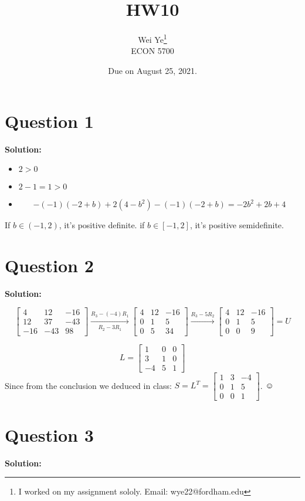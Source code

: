 \documentclass[11pt]{article} %
\title{HW10}
\author{Wei Ye\footnote{I worked on my assignment sololy. Email: wye22@fordham.edu}  	\\
	ECON 5700}
\date{Due on August 25, 2021.}
\begin{document}
	\maketitle
	\section{Question 1}
	\textbf{Solution:}
	
	\begin{itemize}
		\item $2>0$
		\item $2-1=1>0$
		\item 
		$$-(-1)(-2+b)+2(4-b^2)-(-1)(-2+b)=-2b^2+2b+4$$		
		\end{itemize}
			If $b\in (-1,2)$, it's positive definite. if $b\in [-1,2]$, it's positive semidefinite.
	
	
\section{Question 2}
\textbf{Solution:}

$$\begin{bmatrix}
	4&12&-16\\
	12&37&-43\\
	-16&-43&98
\end{bmatrix}\xrightarrow[R_2-3R_1]{R_3-(-4)R_1}\begin{bmatrix}
4&12&-16\\
0&1&5\\
0&5&34
\end{bmatrix}\xrightarrow{R_3-5R_2}\begin{bmatrix}
4&12&-16\\
0&1&5\\
0&0&9
\end{bmatrix}=U$$

$$L=\begin{bmatrix}
	1&0&0\\
	3&1&0\\
	-4&5&1
\end{bmatrix}$$
Since from the conclusion we deduced in class: $S=L^{T}=\begin{bmatrix}
	1&3&-4\\
	0&1&5\\
	0&0&1
\end{bmatrix}$. $\smiley$

\section{Question 3}
\textbf{Solution:}
\end{document}
